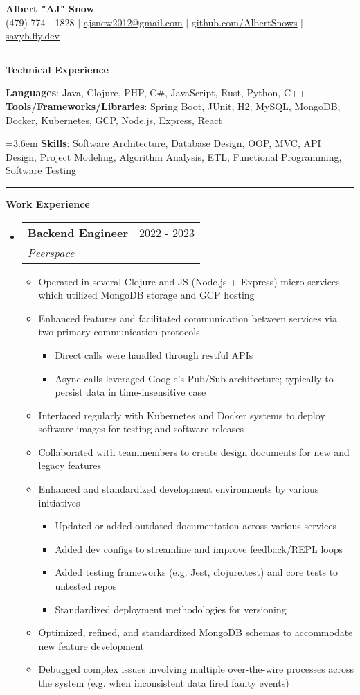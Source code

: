 \documentclass[letterpaper,11pt]{article}
\makeatletter
\newcommand{\resumeItem}[1]{
  \item\small{
    {#1 \vspace{-2pt}}
  }
}
\newcommand{\resumeSubheading}[4]{
  \vspace{-2pt}\item
    \begin{tabular*}{0.97\textwidth}[t]{l@{\extracolsep{\fill}}r}
      \textbf{#1} & #2 \\
      \textit{\small#3} & \textit{\small #4} \\
    \end{tabular*}\vspace{0pt}
}
\newcommand{\resumeSubHeadingListStart}{\begin{itemize}[leftmargin=0.15cm, label={}]}
\newcommand{\resumeSubHeadingListEnd}{\end{itemize}}
\newcommand{\resumeItemListStart}{\begin{itemize}}
\newcommand{\resumeItemListEnd}{\end{itemize}\vspace{-5pt}}
\makeatother
\begin{document}
\textbf{\normalshape \Large \textcolor{magic_blue}{Albert "AJ" Snow}} \\ \vspace{3pt}
\small (479) 774 - 1828 $|$ \href{mailto:ajsnow2012@gmail.com}
{\underline{ajsnow2012@gmail.com}} $|$
\href{https://github.com/AlbertSnows}{\underline{github.com/AlbertSnows}}
$|$ \href{https://savyb.fly.dev/}{\underline{savyb.fly.dev}}
\noindent\rule{19.5cm}{0.4pt}

\textbf{\large \textcolor{magic_blue}{Technical Experience} }

\begin{onehalfspace}
    \textbf{ Languages}{: Java, Clojure, PHP, C\#, JavaScript, Rust, Python, C++ } \\
    \textbf{ Tools/Frameworks/Libraries}{: Spring Boot, JUnit, H2, MySQL, MongoDB, Docker, Kubernetes, GCP, Node.js, Express, React } \\
\end{onehalfspace}
\hangindent=3.6em
\textbf{ Skills}{: }
Software Architecture, Database Design, OOP, MVC, 
API Design, Project Modeling, Algorithm Analysis, 
ETL, Functional Programming, Software Testing
\noindent\rule{19.5cm}{0.4pt}

\textbf{\large \textcolor{magic_blue}{Work Experience}}
\resumeSubHeadingListStart
\resumeSubheading
{Backend Engineer}{2022 - 2023}
{Peerspace}{}
\resumeItemListStart
\resumeItem{Operated in several Clojure and JS (Node.js + Express) micro-services which utilized MongoDB storage and GCP hosting}
\resumeItem{Enhanced features and facilitated communication between services via two primary communication protocols}
\begin{itemize}
    \item Direct calls were handled through restful APIs
    \item Async calls leveraged Google's Pub/Sub architecture; typically to persist data in time-insensitive case
\end{itemize}
\resumeItem{Interfaced regularly with Kubernetes and Docker systems to deploy software images for testing and software releases}
\resumeItem{Collaborated with teammembers to create design documents for new and legacy features}
\resumeItem{Enhanced and standardized development environments by various initiatives}
\begin{itemize}
    \item Updated or added outdated documentation across various services
    \item Added dev configs to streamline and improve feedback/REPL loops
    \item Added testing frameworks (e.g. Jest, clojure.test) and core tests to untested repos
    \item Standardized deployment methodologies for versioning
\end{itemize}
\resumeItem{Optimized, refined, and standardized MongoDB schemas to accommodate new feature development}
\resumeItem{Debugged complex issues involving multiple over-the-wire processes across the system (e.g. when inconsistent data fired faulty events) }
\resumeItemListEnd
\resumeSubHeadingListEnd
\end{document}
